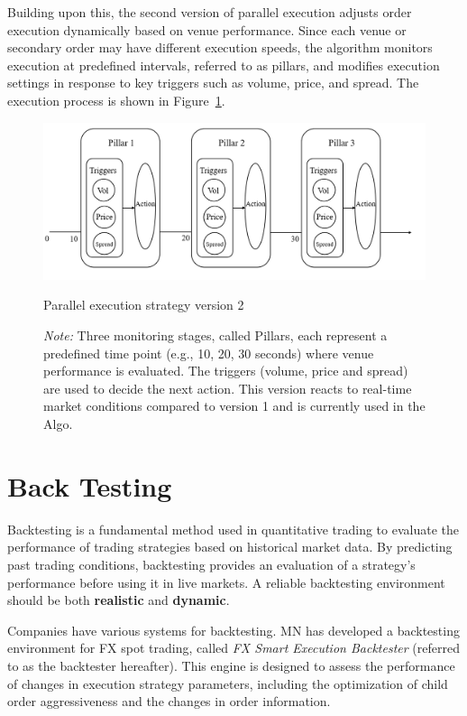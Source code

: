 Building upon this, the second version of parallel execution adjusts order execution dynamically based on venue performance. Since each venue or secondary order may have different execution speeds, the algorithm monitors execution at predefined intervals, referred to as pillars, and modifies execution settings in response to key triggers such as volume, price, and spread. The execution process is shown in Figure~\ref{fig:venue_submission_3}.
\begin{figure}[h]
    \centering
    \includegraphics[width=0.8\linewidth]{figures/venue_submission_3.png}
    \caption{Parallel execution strategy version 2}
    \caption*{\textit{Note:} Three monitoring stages, called Pillars, each represent a predefined time point (e.g., 10, 20, 30 seconds) where venue performance is evaluated. The triggers (volume, price and spread) are used to decide the next action. This version reacts to real-time market conditions compared to version 1 and is currently used in the Algo.}
    \label{fig:venue_submission_3}
\end{figure}



\section{Back Testing} \label{sec:backtester}
Backtesting is a fundamental method used in quantitative trading to evaluate the performance of trading strategies based on historical market data. By predicting past trading conditions, backtesting provides an evaluation of a strategy's performance before using it in live markets. A reliable backtesting environment should be both \textbf{realistic} and \textbf{dynamic}.

Companies have various systems for backtesting. MN has developed a backtesting environment for FX spot trading, called \textit{FX Smart Execution Backtester} (referred to as the backtester hereafter). This engine is designed to assess the performance of changes in execution strategy parameters, including the optimization of child order aggressiveness and the changes in order information. 

